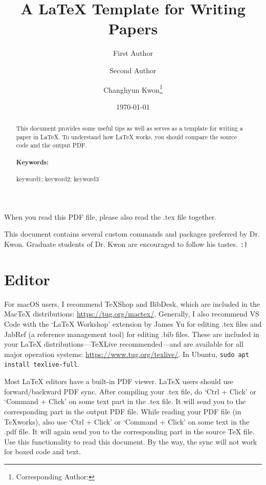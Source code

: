 \documentclass[letterpaper, 11pt]{article}
\title{A LaTeX Template for Writing Papers}
\author[1]{First Author}
\author[2]{Second Author}
\author[3]{Changhyun Kwon\footnote{Corresponding Author: \email{chkwon@kaist.ac.kr}}}
\affil[1]{Department of First Engineering, First University}
\affil[2]{Department of Second Engineering, First University}
\affil[3]{Department of Industrial and Systems Engineering, KAIST, Daejeon, 34141, Republic of Korea}
\date{\today}
\newcommand{\bluenote}[1]{{\Large\color{blue}#1}}
\newcommand{\rednote}[1]{{\Large\color{red}#1}}
\begin{document}
\maketitle

\begin{abstract}
This document provides some useful tips as well as serves as a template for writing a paper in LaTeX.
To understand how LaTeX works, you should compare the source code and the output PDF.

\paragraph{Keywords:} keyword1; keyword2; keyword3
\end{abstract}



\rednote{When you read this PDF file, please also read the .tex file together.}

\bluenote{This document contains several custom commands and packages preferred by Dr. Kwon.
Graduate students of Dr. Kwon are encouraged to follow his tastes. \texttt{:)}}


\section{Editor} \label{sec:editor}

For macOS users, I recommend TeXShop and BibDesk, which are included in the MacTeX distributions: \url{https://tug.org/mactex/}. 
Generally, I also recommend VS Code with the `LaTeX Workshop' extension by James Yu for editing .tex files and JabRef (a reference management tool) for editing .bib files. These are included in your LaTeX distributions---TeXLive recommended---and are available for all major operation systems: \url{https://www.tug.org/texlive/}.
In Ubuntu, \texttt{sudo apt install texlive-full}.

Most LaTeX editors have a built-in PDF viewer.
LaTeX users should use forward/backward PDF sync.
After compiling your .tex file, do `Ctrl + Click' or `Command + Click' on some text part in the .tex file.
It will send you to the corresponding part in the output PDF file.
While reading your PDF file (in TeXworks), also use `Ctrl + Click' or `Command + Click' on some text in the .pdf file.
It will again send you to the corresponding part in the source TeX file.
Use this functionality to read this document.
By the way, the sync will not work for boxed code and text.
\end{document}
